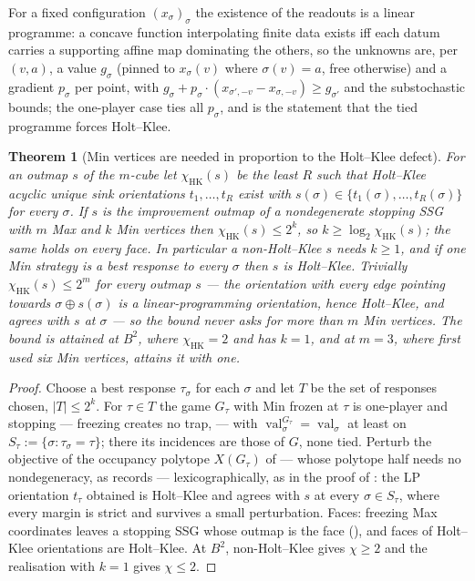 \documentclass[11pt]{article}
\theoremstyle{plain}
\newtheorem{theorem}{Theorem}[section]
\theoremstyle{definition}
\DeclareMathOperator{\val}{val}
\begin{document}
For a fixed configuration $(x_\sigma)_\sigma$ the existence of the
readouts is a linear programme: a concave function interpolating finite
data exists iff each datum carries a supporting affine map dominating the
others, so the unknowns are, per $(v,a)$, a value $g_\sigma$ (pinned to
$x_\sigma(v)$ where $\sigma(v)=a$, free otherwise) and a gradient
$p_\sigma$ per point, with
$g_\sigma+p_\sigma\cdot(x_{\sigma',-v}-x_{\sigma,-v})\ge g_{\sigma'}$ and
the substochastic bounds; the one-player case ties all $p_\sigma$, and
 is the statement that the tied programme forces
Holt--Klee.

\begin{theorem}[Min vertices are needed in proportion to the Holt--Klee defect]\label{thm:min-count}
For an outmap $s$ of the $m$-cube let $\chi_{\mathrm{HK}}(s)$ be the
least $R$ such that Holt--Klee acyclic unique sink orientations
$t_1,\dots,t_R$ exist with $s(\sigma)\in\{t_1(\sigma),\dots,t_R(\sigma)\}$
for every $\sigma$. If $s$ is the improvement outmap of a nondegenerate
stopping SSG with $m$ Max and $k$ Min vertices then
$\chi_{\mathrm{HK}}(s)\le2^{k}$, so $k\ge\log_2\chi_{\mathrm{HK}}(s)$;
the same holds on every face. In particular a non-Holt--Klee $s$ needs
$k\ge1$, and if one Min strategy is a best response to every $\sigma$
then $s$ is Holt--Klee. Trivially $\chi_{\mathrm{HK}}(s)\le2^{m}$ for
every outmap $s$ --- the orientation with every edge pointing towards
$\sigma\oplus s(\sigma)$ is a linear-programming orientation, hence
Holt--Klee, and agrees with $s$ at $\sigma$ --- so the bound never asks
for more than $m$ Min vertices. The bound is attained at $B^{2}$, where
$\chi_{\mathrm{HK}}=2$ and  has $k=1$, and at
$m=3$, where  first used six Min vertices,
 attains it with one.
\end{theorem}

\begin{proof}
Choose a best response $\tau_\sigma$ for each $\sigma$ and let $T$ be
the set of responses chosen, $|T|\le2^{k}$. For $\tau\in T$ the game
$G_\tau$ with Min frozen at $\tau$ is one-player and stopping --- freezing
creates no trap,  --- with $\val^{G_\tau}_\sigma=\val_\sigma$ at least on
$S_\tau:=\{\sigma:\tau_\sigma=\tau\}$; there its incidences are those of
$G$, none tied. Perturb the objective of the occupancy polytope
$X(G_\tau)$ of  --- whose polytope half needs no
nondegeneracy, as  records --- lexicographically,
as in the proof of : the LP orientation $t_\tau$ obtained is
Holt--Klee and agrees with $s$ at every $\sigma\in S_\tau$, where every
margin is strict and survives a small perturbation.
Faces: freezing Max coordinates leaves a stopping SSG whose outmap is the
face (), and faces of Holt--Klee orientations are
Holt--Klee. At $B^{2}$, non-Holt--Klee gives $\chi\ge2$ and the
realisation with $k=1$ gives $\chi\le2$.
\end{proof}
\end{document}
